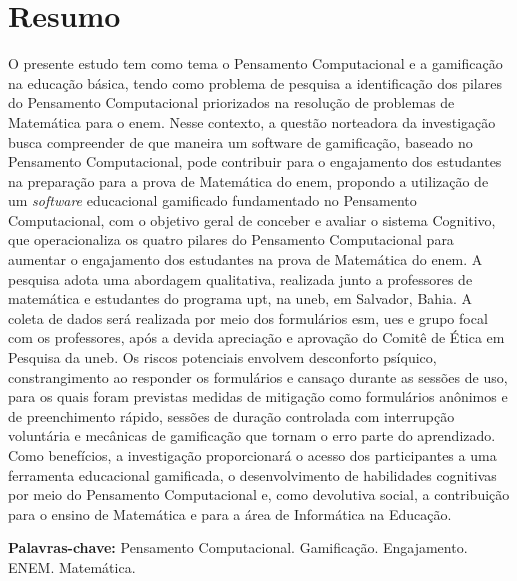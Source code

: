 
\chapter{Resumo}
\label{ch:resumo}
O presente estudo tem como tema o Pensamento Computacional e a gamificação na educação básica, tendo como problema de pesquisa a identificação dos pilares do Pensamento Computacional priorizados na resolução de problemas de Matemática para o \gls{enem}. Nesse contexto, a questão norteadora da investigação busca compreender de que maneira um software de gamificação, baseado no Pensamento Computacional, pode contribuir para o engajamento dos estudantes na preparação para a prova de Matemática do \gls{enem}, propondo a utilização de um \textit{software} educacional gamificado fundamentado no Pensamento Computacional, com o objetivo geral de conceber e avaliar o sistema Cognitivo, que operacionaliza os quatro pilares do Pensamento Computacional para aumentar o engajamento dos estudantes na prova de Matemática do \gls{enem}. A pesquisa adota uma abordagem qualitativa, realizada junto a professores de matemática e estudantes do programa \gls{upt}, na \gls{uneb}, em Salvador, Bahia. A coleta de dados será realizada por meio dos formulários \gls{esm}, \gls{ues} e grupo focal com os professores, após a devida apreciação e aprovação do Comitê de Ética em Pesquisa da \gls{uneb}. Os riscos potenciais envolvem desconforto psíquico, constrangimento ao responder os formulários e cansaço durante as sessões de uso, para os quais foram previstas medidas de mitigação como formulários anônimos e de preenchimento rápido, sessões de duração controlada com interrupção voluntária e mecânicas de gamificação que tornam o erro parte do aprendizado. Como benefícios, a investigação proporcionará o acesso dos participantes a uma ferramenta educacional gamificada, o desenvolvimento de habilidades cognitivas por meio do Pensamento Computacional e, como devolutiva social, a contribuição para o ensino de Matemática e para a área de Informática na Educação.

\textbf{Palavras-chave:} Pensamento Computacional. Gamificação. Engajamento. ENEM. Matemática.